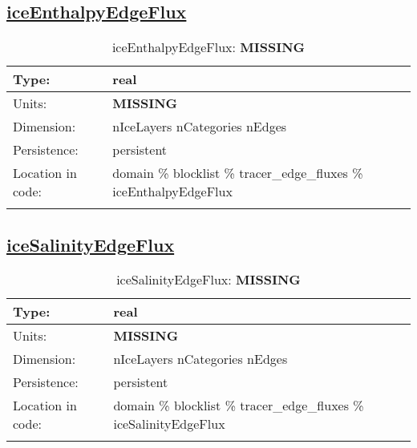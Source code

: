 \subsection[iceEnthalpyEdgeFlux]{\hyperref[sec:var_tab_tracer_edge_fluxes]{iceEnthalpyEdgeFlux}}
\label{subsec:var_sec_tracer_edge_fluxes_iceEnthalpyEdgeFlux}
\begin{center}
\begin{longtable}{| p{2.0in} | p{4.0in} |}
        \hline 
        Type: & real \\
        \hline 
        Units: & {\bf \color{red} MISSING} \\
        \hline 
        Dimension: & nIceLayers nCategories nEdges \\
        \hline 
        Persistence: & persistent \\
        \hline 
         Location in code: & domain \% blocklist \% tracer\_edge\_fluxes \% iceEnthalpyEdgeFlux \\
         \hline 
    \caption{iceEnthalpyEdgeFlux: {\bf \color{red} MISSING}}
\end{longtable}
\end{center}
\subsection[iceSalinityEdgeFlux]{\hyperref[sec:var_tab_tracer_edge_fluxes]{iceSalinityEdgeFlux}}
\label{subsec:var_sec_tracer_edge_fluxes_iceSalinityEdgeFlux}
\begin{center}
\begin{longtable}{| p{2.0in} | p{4.0in} |}
        \hline 
        Type: & real \\
        \hline 
        Units: & {\bf \color{red} MISSING} \\
        \hline 
        Dimension: & nIceLayers nCategories nEdges \\
        \hline 
        Persistence: & persistent \\
        \hline 
         Location in code: & domain \% blocklist \% tracer\_edge\_fluxes \% iceSalinityEdgeFlux \\
         \hline 
    \caption{iceSalinityEdgeFlux: {\bf \color{red} MISSING}}
\end{longtable}
\end{center}
